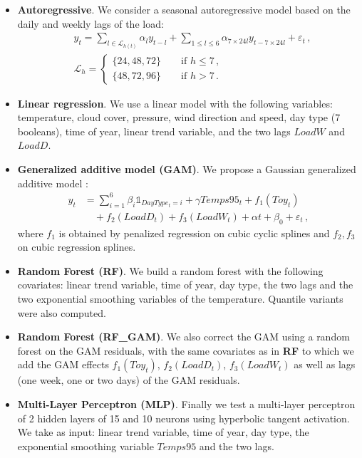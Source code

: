 \documentclass[transmag]{IEEEtran}
\begin{document}
\begin{itemize}
\item
{\bf Autoregressive}. We consider a seasonal autoregressive model based on the daily and weekly lags of the load:
\begin{align}
    & \label{eq:autoregressive}
    y_t = \sum\limits_{l\in\mathcal{L}_{h(t)}} \alpha_{l} y_{t-l} + \sum\limits_{1\le l\le 6} \alpha_{7\times24l} y_{t-7\times24l} + \varepsilon_t\,,\\
    \nonumber & \mathcal{L}_{h} = \begin{cases}
    \{24,48,72\}\qquad \text{if } h\le 7 \,,\\
    \{48,72,96\}\qquad \text{if } h> 7\,.
    \end{cases}
\end{align}

\item
{\bf Linear regression}. We use a linear model with the following variables: temperature, cloud cover, pressure, wind direction and speed, day type (7 booleans), time of year, linear trend variable, and the two lags $LoadW$ and $LoadD$.

\item
\textbf{Generalized additive model (GAM)}. We propose a Gaussian generalized additive model \cite{wood2017generalized}:
\begin{align*}
    y_t & = \sum_{i=1}^6 \beta_i \mathds{1}_{DayType_t = i} + \gamma Temps95_t + f_1(Toy_t) \\
    & \quad + f_2(LoadD_t) + f_3(LoadW_t) + \alpha t + \beta_0 + \varepsilon_t \,,
\end{align*}
where $f_1$ is obtained by penalized regression on cubic cyclic splines and $f_2,f_3$ on cubic regression splines.

\item
\textbf{Random Forest (RF)}. We build a random forest \cite{RF} with the following covariates: linear trend variable, time of year, day type, the two lags and the two exponential smoothing variables of the temperature. Quantile variants were also computed.

\item
\textbf{Random Forest (RF\_GAM)}. We also correct the GAM using a random forest on the GAM residuals, with the same covariates as in {\bf RF} to which we add the GAM effects $f_1(Toy_t)$, $f_2(LoadD_t)$, $f_3(LoadW_t)$ as well as lags (one week, one or two days) of the GAM residuals.

\item
\textbf{Multi-Layer Perceptron (MLP)}. Finally we test a multi-layer perceptron of 2 hidden layers of 15 and 10 neurons using hyperbolic tangent activation. We take as input: linear trend variable, time of year, day type, the exponential smoothing variable $Temps95$ and the two lags.
\end{itemize}
\end{document}
